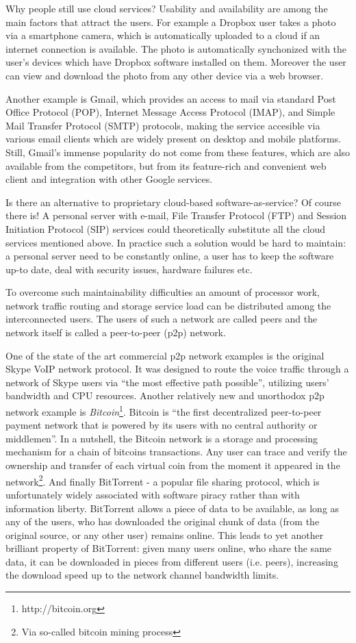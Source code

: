 Why people still use cloud services? Usability and availability are
among the main factors that attract the users. For example a Dropbox
user takes a photo via a smartphone camera, which is automatically
uploaded to a cloud if an internet connection is available.
The photo is automatically synchonized with the user's devices which
have Dropbox software installed on them. Moreover the user can
view and download the photo from any other device via a web browser.

Another example is Gmail, which provides an access to mail via
standard
Post Office Protocol (POP),
Internet Message Access Protocol (IMAP),
and Simple Mail Transfer Protocol (SMTP)
protocols, making the service accesible
via various email clients which are widely present on desktop
and mobile platforms. Still, Gmail's immense
popularity\cite{gmail-popularity}
do not come from these features, which are also available
from the competitors, but from its feature-rich and convenient
web client and integration with other Google services.

Is there an alternative to proprietary cloud-based
software-as-service?
Of course there is! A personal server with e-mail,
File Transfer Protocol (FTP) and
Session Initiation Protocol (SIP)
services could theoretically substitute all the cloud services
mentioned above. In practice such a solution would be hard to maintain:
a personal server need to be constantly online, a user has to keep
the software up-to date, deal with security issues, hardware failures
etc.

To overcome such maintainability difficulties an amount of
processor work, network traffic routing and storage service load
can be distributed among the interconnected users.
The users of such a network are called peers and the network
itself is called a peer-to-peer (p2p) network.

One of the state of the art commercial p2p network examples is the
original Skype VoIP network protocol. It was designed to route the
voice traffic through a network of Skype users via
``the most effective path possible''\cite{skype-p2p}, utilizing
users' bandwidth and CPU resources.
Another relatively new and unorthodox p2p network example is
\emph{Bitcoin}\footnote{http://bitcoin.org}. Bitcoin is
``the first decentralized peer-to-peer payment network that
is powered by its users with no central authority or middlemen''.
In a nutshell, the Bitcoin network is a storage and processing
mechanism for a chain of bitcoins transactions. Any user can
trace and verify the ownership and transfer of each virtual
coin from the moment it appeared in the network\footnote{Via
so-called bitcoin mining process}.
And finally BitTorrent - a popular file sharing protocol, which is
unfortunately widely associated with software piracy rather than
with information liberty. BitTorrent allows a piece of data to be
available, as long as any of the users, who has downloaded the original
chunk of data (from the original source, or any other user) remains
online. This leads to yet another brilliant property of BitTorrent:
given many users online, who share the same data, it can be downloaded
in pieces from different users (i.e. peers), increasing the download
speed up to the network channel bandwidth limits.


